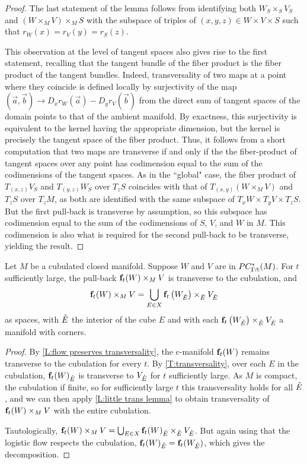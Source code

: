 \begin{proof}
	The last statement of the lemma follows from identifying both $W_S \times_S V_S$ and $ (W \times_M V) \times_M S$ with
	the subspace of triples of $(x,y,z) \in W \times V \times S$ such that $r_W(x) = r_V(y) = r_S(z)$.

	This observation at the level of tangent spaces	also gives rise to the first statement, recalling that the tangent bundle of the fiber product is the fiber product of the tangent bundles.
	Indeed, transversality of two maps at a point where they coincide is defined locally by surjectivity of the map $(\vec a,\vec b)\to D_xr_W(\vec a)-D_yr_V(\vec b)$ from the direct sum of tangent spaces of the domain points to that of the ambient manifold.
	By exactness, this surjectivity is equivalent to the kernel having the appropriate dimension, but the kernel is precisely the tangent space of the	fiber product.
	Thus, it follows from a short computation that two maps are transverse if and only if the the fiber-product of tangent spaces over any point has codimension equal to the sum of the codimensions of the tangent spaces.
	As in the ``global" case, the fiber product of $T_{(x,z)} V_S$ and $T_{(y,z)} W_S$ over $T_zS$ coincides with that of $T_{(x,y)} (W \times_M V)$ and $T_z S$ over $T_z M$, as both are identified with the same subspace of $T_x W \times T_y V \times T_z S$.
	But the first pull-back is transverse by assumption, so this subspace has codimension equal to the sum of the codimensions of $S$, $V$, and $W$ in $M$.
	This codimension is also what is required for the second pull-back to be transverse, yielding the result.
\end{proof}

\begin{proposition}\label{P:locality}
	Let $M$ be a cubulated closed manifold.
	Suppose $W$ and $V$ are in $PC_{\Gamma \pitchfork}^*(M)$.
	For $t$ sufficiently large, the pull-back $\mathbf{f}_t(W) \times_M V$ is transverse to the cubulation, and
	\[
	\mathbf{f}_t(W) \times_M V = \bigcup_{E \in X} {\mathbf{f}_t\left(W_{\mathring{E}}\right)} \times_{\mathring{E}} V_{\mathring{E}}
	\]
	as spaces, with $\mathring{E}$ the interior of the cube $E$ and with each ${\mathbf{f}_t\left(W_{\mathring{E}}\right)} \times_{\mathring{E}} V_{\mathring{E}}$ a manifold with corners.
\end{proposition}

\begin{proof}
	By \cref{L:flow preserves transversality}, the c-manifold $\mathbf{f}_t(W)$ remains transverse to the cubulation for every $t$.
	By \cref{T:transversality}, over each $E$ in the cubulation, $\mathbf{f}_t(W)_{\mathring{E}}$ is transverse to $V_{\mathring{E}}$ for $t$ sufficiently large.
	As $M$ is compact, the cubulation if finite, so for sufficiently large $t$ this transversality holds for all $\mathring{E}$, and we can then apply \cref{L:little trans lemma} to obtain transversality of $\mathbf{f}_t(W) \times_M V$ with the entire cubulation.

	Tautologically, $ \mathbf{f}_t(W) \times_M V = \bigcup_{E \in X} {\mathbf{f}_t(W)}_{\mathring{E}} \times_{\mathring{E}} V_{\mathring{E}}$.
	But again using that the logistic flow respects the cubulation, ${\mathbf{f}_t(W)}_{\mathring{E}} = {\mathbf{f}_t(W_{\mathring{E}})}$, which gives the decomposition.\qedhere
\end{proof}

